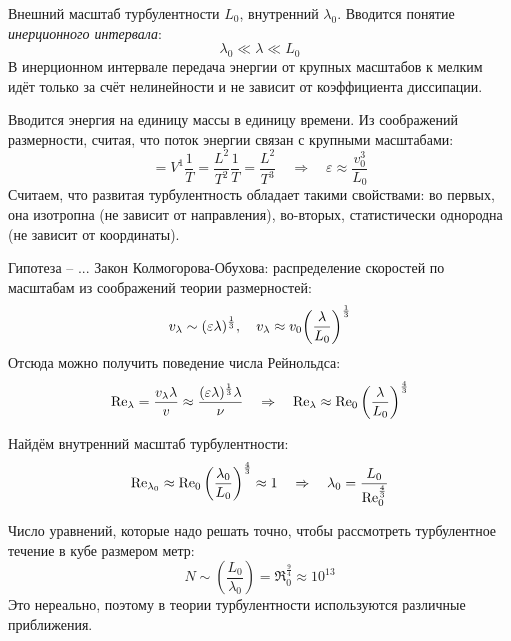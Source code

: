 Внешний масштаб турбулентности $L_0$, внутренний $\lambda_0$.
Вводится понятие \textit{инерционного интервала}:
\begin{equation}
    \lambda_0 \ll \lambda \ll L_0
\end{equation}
В инерционном интервале передача энергии от крупных масштабов к
мелким идёт только за счёт нелинейности и не зависит от коэффициента
диссипации.

Вводится энергия на единицу массы в единицу времени. Из соображений
размерности, считая, что поток энергии связан с крупными масштабами:
\begin{equation}
    [\varepsilon] = V^1 \frac{1}{T} = \frac{L^2}{T^2}\frac{1}{T}=
    \frac{L^2}{T^3} 
    \quad\Rightarrow\quad 
    \varepsilon \approx \frac{v_0^3}{L_0}
\end{equation}
Считаем, что развитая турбулентность обладает такими свойствами:
во первых, она изотропна (не зависит от направления), во-вторых, 
статистически однородна (не зависит от координаты).

Гипотеза -- ...
Закон Колмогорова-Обухова: распределение скоростей по масштабам из
соображений теории размерностей:
\begin{equation}
    v_\lambda \sim (\varepsilon \lambda)^\frac{1}{3}, 
    \quad 
    v_\lambda \approx v_0 \qty(\frac{\lambda}{L_0})^\frac{1}{3}
\end{equation}
Отсюда можно получить поведение числа Рейнольдса:
\begin{equation}
    \Re_{\lambda} = \frac{v_\lambda \lambda}{v} \approx 
        \frac{(\varepsilon \lambda)^\frac{1}{3} \lambda}{\nu} 
        \quad\Rightarrow\quad 
        \Re_\lambda \approx \Re_0 \qty(\frac{\lambda}{L_0})^\frac{4}{3}
\end{equation}

Найдём внутренний масштаб турбулентности:
\begin{equation}
    \Re_{\lambda_0} \approx \Re_0 
        \qty(\frac{\lambda_0}{L_0})^\frac{4}{3}    \approx 1 
        \quad\Rightarrow\quad 
        \lambda_0 = \frac{L_0}{\Re_0^\frac{4}{3}}
\end{equation}

Число уравнений, которые надо решать точно, чтобы 
рассмотреть турбулентное течение в кубе размером метр:
\begin{equation}
    N \sim (\frac{L_0}{\lambda_0})= \Re_0^{\frac{9}{4}} \approx 10^{13} 
\end{equation}
Это нереально, поэтому в теории турбулентности используются различные
приближения.

